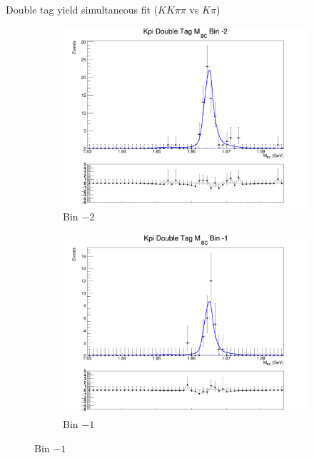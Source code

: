 \documentclass{beamer}
\begin{document}
\begin{frame}{Double tag yield simultaneous fit ($KK\pi\pi$ vs $K\pi$)}
\begin{figure}
    \begin{subfigure}{0.38\textwidth}
      \centering
      \includegraphics[width=\textwidth]{Plots/DoubleTagYield_DoubleTag_Flavour_KKpipi_vs_Kpi_SignalBinM2_TagBin0.png}
      \caption{Bin $-2$}
    \end{subfigure}%
    \begin{subfigure}{0.38\textwidth}
      \centering
      \includegraphics[width=\textwidth]{Plots/DoubleTagYield_DoubleTag_Flavour_KKpipi_vs_Kpi_SignalBinM1_TagBin0.png}
      \caption{Bin $-1$}
    \end{subfigure}
  \end{figure}
\end{frame}
\end{document}
